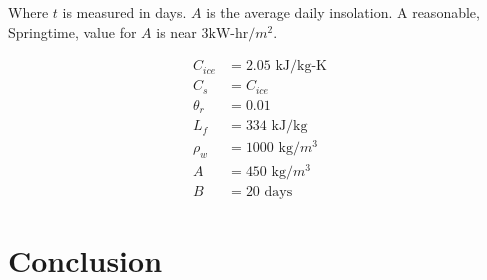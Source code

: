 \documentclass{article}
\begin{document}
Where $t$ is measured in days.
$A$ is the average daily insolation.
A reasonable, Springtime, value for $A$ is near $3 \text{kW-hr}/m^2$.

\begin{align}
 C_{ice} &= 2.05 \text{ kJ/kg-K} \\
 C_s &= C_{ice} \\
\theta_r &= 0.01 \\
L_f &= 334 \text{ kJ/kg} \\
\rho_w &= 1000 \text{ kg/$m^3$} \\
A &= 450 \text{ kg/$m^3$} \\
B &= 20 \text{ days}
\end{align}

 \section{Conclusion}



\end{document}

